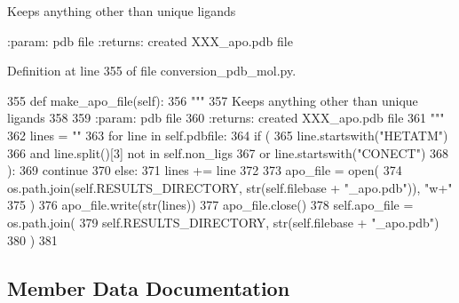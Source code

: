 \begin{DoxyVerb}Keeps anything other than unique ligands

:param: pdb file
:returns: created XXX_apo.pdb file
\end{DoxyVerb}
 

Definition at line 355 of file conversion\+\_\+pdb\+\_\+mol.\+py.


\begin{DoxyCode}
355     \textcolor{keyword}{def }make\_apo\_file(self):
356         \textcolor{stringliteral}{"""}
357 \textcolor{stringliteral}{        Keeps anything other than unique ligands}
358 \textcolor{stringliteral}{}
359 \textcolor{stringliteral}{        :param: pdb file}
360 \textcolor{stringliteral}{        :returns: created XXX\_apo.pdb file}
361 \textcolor{stringliteral}{        """}
362         lines = \textcolor{stringliteral}{""}
363         \textcolor{keywordflow}{for} line \textcolor{keywordflow}{in} self.pdbfile:
364             \textcolor{keywordflow}{if} (
365                 line.startswith(\textcolor{stringliteral}{"HETATM"})
366                 \textcolor{keywordflow}{and} line.split()[3] \textcolor{keywordflow}{not} \textcolor{keywordflow}{in} self.non\_ligs
367                 \textcolor{keywordflow}{or} line.startswith(\textcolor{stringliteral}{"CONECT"})
368             ):
369                 \textcolor{keywordflow}{continue}
370             \textcolor{keywordflow}{else}:
371                 lines += line
372 
373         apo\_file = open(
374             os.path.join(self.RESULTS\_DIRECTORY, str(self.filebase + \textcolor{stringliteral}{"\_apo.pdb"})), \textcolor{stringliteral}{"w+"}
375         )
376         apo\_file.write(str(lines))
377         apo\_file.close()
378         self.apo\_file = os.path.join(
379             self.RESULTS\_DIRECTORY, str(self.filebase + \textcolor{stringliteral}{"\_apo.pdb"})
380         )
381 
\end{DoxyCode}


\subsection{Member Data Documentation}
\mbox{\label{classfragalysis__api_1_1xcimporter_1_1conversion__pdb__mol_1_1pdb__apo_a9e655f451df734d5f78e8a41b8c47f89}} 
